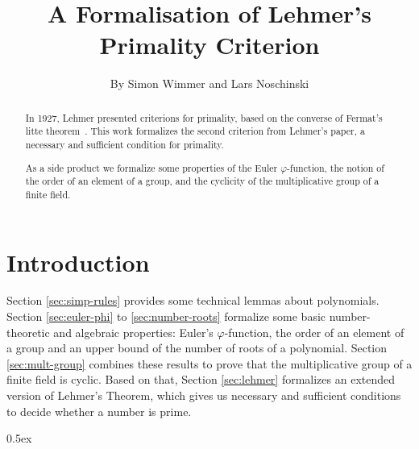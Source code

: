 \documentclass[11pt,a4paper]{article}
\begin{document}
\title{A Formalisation of Lehmer's Primality Criterion}
\author{By Simon Wimmer and Lars Noschinski}
\maketitle

\begin{abstract}
  In 1927, Lehmer presented criterions for primality, based on the
  converse of Fermat's litte theorem~\cite{lehmer1927fermat_converse}.
  This work formalizes the second criterion from Lehmer's paper,
  a necessary and sufficient condition for primality.

  As a side product we formalize
  some properties of the Euler $\varphi$-function,
  the notion of the order of an element of a group,
  and the cyclicity of the multiplicative group of a finite field.
\end{abstract}

\tableofcontents

\section{Introduction}

Section \ref{sec:simp-rules} provides some technical lemmas about polynomials.
Section \ref{sec:euler-phi} to \ref{sec:number-roots} formalize some basic number-theoretic
and algebraic properties: Euler's $\varphi$-function, the order of an element of a group
and an upper bound of the number of roots of a polynomial. Section \ref{sec:mult-group}
combines these results to prove that the multiplicative group of a finite field is cyclic.
Based on that, Section \ref{sec:lehmer} formalizes an extended version of Lehmer's Theorem,
which gives us necessary and sufficient conditions to decide whether a number is prime.

\parindent 0pt\parskip 0.5ex



\nocite{*}



\end{document}
